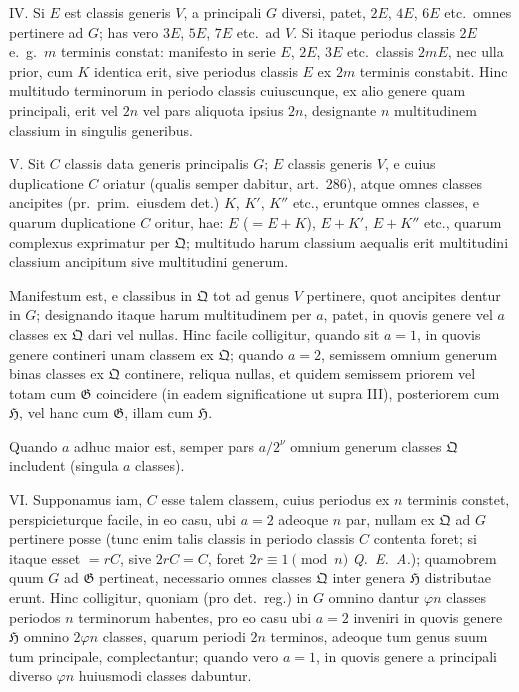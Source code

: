 \documentclass[12pt,a4paper]{article}
\theoremstyle{plain}
\theoremstyle{definition}
\theoremstyle{remark}
\begin{document}
\textsc{IV.} Si $E$ est classis generis $V$, a principali $G$ diversi, patet, $2E$, $4E$, $6E$ etc.~omnes pertinere ad $G$; has vero $3E$, $5E$, $7E$ etc.~ad $V$. Si itaque periodus classis $2E$ e.~g.~$m$ terminis constat: manifesto in serie $E$, $2E$, $3E$ etc.~classis $2mE$, nec ulla prior, cum $K$ identica erit, sive periodus classis $E$ ex $2m$ terminis constabit. Hinc multitudo terminorum in periodo classis cuiuscunque, ex alio genere quam principali, erit vel $2n$ vel pars aliquota ipsius $2n$, designante $n$ multitudinem classium in singulis generibus.

\textsc{V.} Sit $C$ classis data generis principalis $G$; $E$ classis generis $V$, e cuius duplicatione $C$ oriatur (qualis semper dabitur, art.~286), atque omnes classes ancipites (pr.~prim.~eiusdem det.) $K$, $K'$, $K''$ etc., eruntque omnes classes, e quarum duplicatione $C$ oritur, hae: $E$ ($= E+K$), $E+K'$, $E+K''$ etc., quarum complexus exprimatur per $\mathfrak{Q}$; multitudo harum classium aequalis erit multitudini classium ancipitum sive multitudini generum.

Manifestum est, e classibus in $\mathfrak{Q}$ tot ad genus $V$ pertinere, quot ancipites dentur in $G$; designando itaque harum multitudinem per $a$, patet, in quovis genere vel $a$ classes ex $\mathfrak{Q}$ dari vel nullas. Hinc facile colligitur, quando sit $a = 1$, in quovis genere contineri unam classem ex $\mathfrak{Q}$; quando $a = 2$, semissem omnium generum binas classes ex $\mathfrak{Q}$ continere, reliqua nullas, et quidem semissem priorem vel totam cum $\mathfrak{G}$ coincidere (in eadem significatione ut supra III), posteriorem cum $\mathfrak{H}$, vel hanc cum $\mathfrak{G}$, illam cum $\mathfrak{H}$.

Quando $a$ adhuc maior est, semper pars $a/2^{\nu}$ omnium generum classes $\mathfrak{Q}$ includent (singula $a$ classes).

\textsc{VI.} Supponamus iam, $C$ esse talem classem, cuius periodus ex $n$ terminis constet, perspicieturque facile, in eo casu, ubi $a = 2$ adeoque $n$ par, nullam ex $\mathfrak{Q}$ ad $G$ pertinere posse (tunc enim talis classis in periodo classis $C$ contenta foret; si itaque esset $= rC$, sive $2rC = C$, foret $2r \equiv 1 \pmod{n}$ \textit{Q.~E.~A.}); quamobrem quum $G$ ad $\mathfrak{G}$ pertineat, necessario omnes classes $\mathfrak{Q}$ inter genera $\mathfrak{H}$ distributae erunt. Hinc colligitur, quoniam (pro det.~reg.) in $G$ omnino dantur $\varphi n$ classes periodos $n$ terminorum habentes, pro eo casu ubi $a = 2$ inveniri in quovis genere $\mathfrak{H}$ omnino $2\varphi n$ classes, quarum periodi $2n$ terminos, adeoque tum genus suum tum principale, complectantur; quando vero $a = 1$, in quovis genere a principali diverso $\varphi n$ huiusmodi classes dabuntur.
\end{document}
